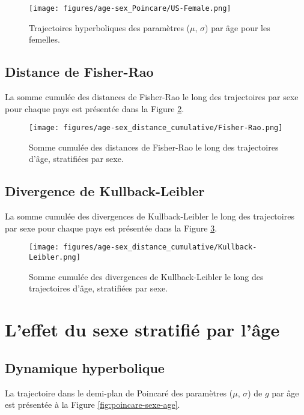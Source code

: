 \begin{figure}[H]
	\centering
	\texttt{[image: figures/age-sex\_Poincare/US-Female.png]}
	\caption{Trajectoires hyperboliques des paramètres ($\mu$, $\sigma$) par âge pour les femelles.}
	\label{fig:age-sex_Poincare_female}
\end{figure}

\subsection{Distance de Fisher-Rao}

La somme cumulée des distances de Fisher-Rao le long des trajectoires par sexe pour chaque pays est présentée dans la Figure \ref{fig:age-sex_FR_cumulative}.

\begin{figure}[H]
\centering
\texttt{[image: figures/age-sex\_distance\_cumulative/Fisher-Rao.png]}
\caption{Somme cumulée des distances de Fisher-Rao le long des trajectoires d'âge, stratifiées par sexe.}
\label{fig:age-sex_FR_cumulative}
\end{figure}

\subsection{Divergence de Kullback-Leibler}

La somme cumulée des divergences de Kullback-Leibler le long des trajectoires par sexe pour chaque pays est présentée dans la Figure \ref{fig:age-sex_KL_cumulative}.

\begin{figure}[H]
	\centering
	\texttt{[image: figures/age-sex\_distance\_cumulative/Kullback-Leibler.png]}
	\caption{Somme cumulée des divergences de Kullback-Leibler le long des trajectoires d'âge, stratifiées par sexe.}
	\label{fig:age-sex_KL_cumulative}
\end{figure}

\section{L'effet du sexe stratifié par l'âge}

\subsection{Dynamique hyperbolique}

La trajectoire dans le demi-plan de Poincaré des paramètres ($\mu$, $\sigma$) de $g$ par âge est présentée à la Figure \ref{fig:poincare-sexe-age}.

